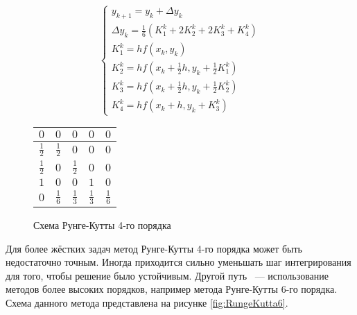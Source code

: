 \begin{figure}
\begin{minipage}[t]{8.5cm}
    {\small
    \begin{equation*}
        \begin{cases}
            y_{k + 1} = y_k + \Delta y_k\\
            \Delta y_k = \frac{1}{6} (K_1^k + 2K_2^k + 2K_3^k + K_4^k)\\
            K_1^k = hf(x_k, y_k)\\
            K_2^k = hf(x_k + \frac{1}{2}h, y_k + \frac{1}{2}K_1^k)\\
            K_3^k = hf(x_k + \frac{1}{2}h, y_k + \frac{1}{2}K_2^k)\\
            K_4^k = hf(x_k + h, y_k + K_3^k)
        \end{cases}
    \end{equation*}
    }
\end{minipage}
\begin{minipage}[t]{7.5cm}
    \begin{table}    
        \begin{tabular}{|c|c|c|c|c|}
        \hline
        $0$ & $0$ & $0$ & $0$ & $0$\\
        \hline
        $\frac{1}{2}$ & $\frac{1}{2}$ & $0$ & $0$ & $0$\\
        \hline
        $\frac{1}{2}$ & $0$ & $\frac{1}{2}$ & $0$ & $0$\\
        \hline
        $1$ & $0$ & $0$ & $1$ & $0$\\
        \hline
        $0$ & \cellcolor{lightgray} $\frac{1}{6}$ & \cellcolor{lightgray} $\frac{1}{3}$ & \cellcolor{lightgray} $\frac{1}{3}$ & \cellcolor{lightgray} $\frac{1}{6}$\\
        \hline
        \end{tabular}
    \end{table}
\end{minipage}
\caption{Схема Рунге-Кутты 4-го порядка}
\label{fig:RungeKutta4}
\end{figure}

Для более жёстких задач метод Рунге-Кутты 4-го порядка может быть недостаточно точным. Иногда приходится сильно уменьшать шаг
интегрирования для того, чтобы решение было устойчивым. Другой путь ~--- использование методов более высоких порядков, например метода
Рунге-Кутты 6-го порядка. Схема данного метода представлена на рисунке \ref{fig:RungeKutta6}.

